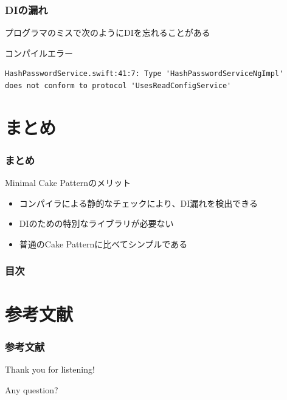 \begin{frame}[fragile]
  \frametitle{DIの漏れ}

  \pause

  プログラマのミスで次のようにDIを忘れることがある
  

  \pause

  \begin{alertblock}{コンパイルエラー}
\begin{lstlisting}[basicstyle=\listingfont\scriptsize]
HashPasswordService.swift:41:7: Type 'HashPasswordServiceNgImpl'
does not conform to protocol 'UsesReadConfigService'
\end{lstlisting}
  \end{alertblock}

  \pause

  \begin{center}
  \end{center}
\end{frame}

\section{まとめ}

\begin{frame}
  \frametitle{まとめ}
  
  \begin{block}{Minimal Cake Patternのメリット}
    \begin{itemize}
      \item<2-> コンパイラによる静的なチェックにより、DI漏れを検出できる
      \item<3-> DIのための特別なライブラリが必要ない
      \item<4-> 普通のCake Patternに比べてシンプルである
    \end{itemize}
  \end{block}
\end{frame}

\begin{frame}
  \frametitle{目次}

  \tableofcontents
\end{frame}

\section*{参考文献}
\begin{frame}
  \frametitle{参考文献}

  
  \nocite{*}
  
\end{frame}

\begin{frame}
  \centering
  {\Huge Thank you for listening!}

  \quad \quad

  {\Huge Any question?}
\end{frame}



